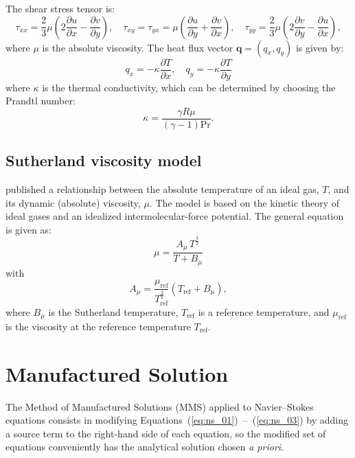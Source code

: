 \documentclass[10pt]{article}
\newcommand{\diff}[2] {\dfrac{\partial #1}{\partial #2}}
\begin{document}
The shear stress tensor is:
\begin{equation}
  \tau_{xx}= \dfrac{2}{3}  \mu \left( 2 \diff{u}{x} - \diff{v}{y} \right),\quad
  \tau_{xy}= \tau_{yx}=\mu \left( \diff{u}{y} + \diff{v}{x}\right),\quad
  \tau_{yy}= \dfrac{2}{3}  \mu \left( 2 \diff{v}{y} - \diff{u}{x}  \right),
\end{equation}
where $\mu$ is the absolute viscosity. The heat flux vector $\mathbf{q}=(q_x,q_y)$ is given by:
\begin{equation}
 q_x = - \kappa \diff{T}{x}, \quad q_y = - \kappa \diff{T}{y}
 \end{equation}
where $\kappa$ is the thermal conductivity, which can be determined by choosing the Prandtl number:
\begin{equation}
 \label{eq:k}
\kappa = \dfrac{\gamma R \mu}{ (\gamma-1) \text{Pr}}.
\end{equation}



\subsection{Sutherland viscosity model}

\citet{Sutherland1893} published a relationship between the absolute temperature of an ideal gas, $T$,  and its dynamic (absolute) viscosity, $\mu$. The model is based on the kinetic theory of ideal gases and an idealized intermolecular-force potential. The general equation is given as:
\begin{equation}
\label{eq:Sutherland01}
 \mu  =\dfrac{A_\mu \, T^{\frac{3}{2}}}{T+B_\mu}
\end{equation}
with
\begin{equation}
\label{eq:Sutherland02}
A_\mu = \dfrac{\mu_\text{ref}}{T_{\text{ref}}^{\frac{3}{2}}}(T_\text{ref} + B_\mu),
\end{equation}
%
where $B_\mu$ is the Sutherland temperature, $T_{\text{ref}}$ is a reference temperature,  and $\mu_\text{ref}$ is the viscosity at the reference temperature $T_\text{ref}$.


\section{Manufactured Solution}

The Method of Manufactured Solutions (MMS) applied to Navier--Stokes equations consists in modifying Equations~(\ref{eq:ns_01})~--~(\ref{eq:ns_03}) by adding a source term to the right-hand side of each equation, so the modified set of equations conveniently has the analytical solution chosen \textit{a priori}.
\end{document}
